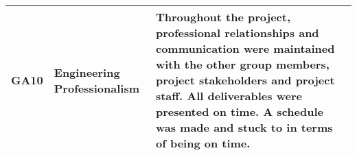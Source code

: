 \documentclass[class=report,11pt,crop=false]{standalone}
\begin{document}
\begin{tabularx}{\textwidth}{|p{} p{} X|}
    GA10 & Engineering Professionalism & Throughout the project, professional relationships and communication were maintained with the other group members, project stakeholders and project staff. All deliverables were presented on time. A schedule was made and stuck to in terms of being on time. \\ \hline


\end{tabularx}
\raggedright

\ifstandalone

\printnoidxglossary[type=\acronymtype,nonumberlist]
\fi
\end{document}
